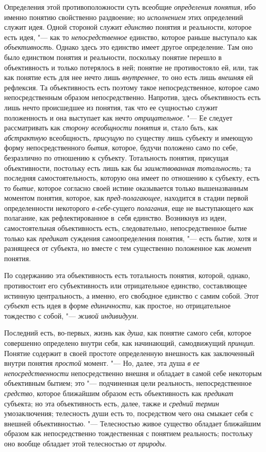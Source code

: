 Определения этой противоположности суть всеобщие {\em определения понятия},
ибо именно понятию свойственно раздвоение; но {\em исполнением} этих
определений служит идея. Одной стороной служит {\em единство} понятия и
реальности, которое есть идея, "--- как то {\em непосредственное}
единство, которое раньше выступало как {\em объективность}.
Однако здесь это единство имеет другое определение. Там оно
было единством понятия и реальности, поскольку понятие перешло в
объективность и только потерялось в ней; понятие не противостояло ей, или,
так как понятие есть для нее нечто лишь
{\em внутреннее}, то оно есть лишь {\em внешняя}
ей рефлексия. Та объективность есть поэтому такое
непосредственное, которое само непосредственным образом непосредственно.
Напротив, здесь объективность есть лишь нечто происшедшее из понятия, так
что ее сущностью служит положенность и она выступает как нечто
{\em отрицательное}. "--- Ее следует рассматривать как {\em сторону
всеобщности понятия} и, стало бьть, как {\em абстрактную}
всеобщность, {\em присущую} по
существу лишь субъекту и имеющую форму непосредственного {\em бытия}, которое,
будучи положено само по себе, безразлично по отношению к субъекту.
Тотальность понятия, присущая объективности, постольку есть лишь как бы
{\em заимствованная тотальность;}
та последняя самостоятельность, которую она
имеет по отношению к субъекту, есть то {\em бытие}, которое
согласно своей истине оказывается только вышеназванным моментом понятия,
которое, как {\em пред-полагающее},
находится в стадии первой определенности некоторого
{\em в-себе}{}-сущего {\em полагания}, еще не выступающего {\em как}
полагание, как рефлектированное в~себя единство. Возникнув
из идеи, самостоятельная объективность есть, следовательно,
непосредственное бытие только как {\em предикат} суждения
самоопределения понятия, "--- есть бытие, хотя и разнящееся от
субъекта, но вместе с тем существенно положенное как {\em момент} понятия.

По содержанию эта объективность есть тотальность понятия,
которой, однако, противостоит его субъективность или отрицательное
единство, составляющее истинную центральность, а именно, его свободное
единство с самим собой. Этот {\em субъект} есть идея в
форме {\em единичности}, как простое, но отрицательное тождество
с собой, "--- {\em живой индивидуум}.

Последний есть, во-первых, жизнь как {\em душа}, как понятие
самого себя, которое совершенно определено внутри себя, как начинающий,
самодвижущий {\em принцип}.
Понятие содержит в своей простоте определенную внешность как
заключенный внутри понятия
{\em простой} момент. "---
Но, далее, эта душа {\em в
ее непосредственности} непосредственно внешня и обладает в
самой себе некоторым объективным бытием; это "--- подчиненная
цели реальность, непосредственное
{\em средство}, которое
ближайшим образом есть объективность как
{\em предикат} субъекта;
но эта объективность есть, далее, также и
{\em средний термин}
умозаключения; телесность души есть то, посредством чего она
смыкает себя с внешней объективностью. "--- Телесностью живое
существо обладает ближайшим образом как непосредственно тождественная с
понятием реальность; постольку оно вообще обладает этой телесностью от
{\em природы}.

